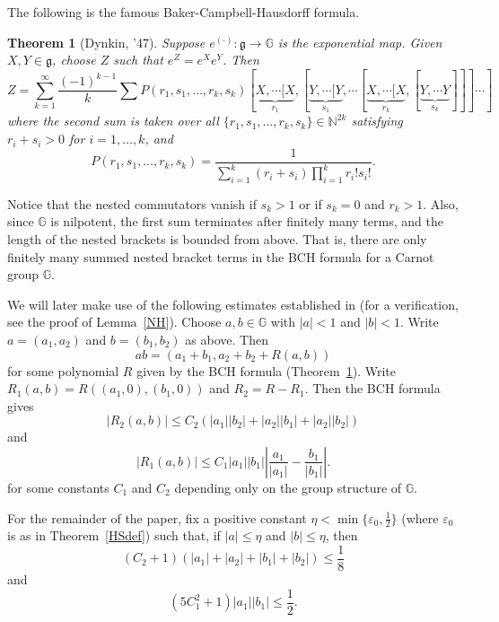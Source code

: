 \documentclass[11pt]{amsart}
\newtheorem{theorem}{Theorem}
\theoremstyle{definition}
\newcommand{\G}{\mathbb G}
\numberwithin{theorem}{section} \numberwithin{equation}{section}
\begin{document}
The following is the famous Baker-Campbell-Hausdorff formula.
\begin{theorem}[Dynkin, '47]
\label{BCH}
Suppose $e^{(\cdot)}:\mathfrak{g} \to \mathbb{G}$ is the exponential map.
Given $X,Y \in \mathfrak{g}$, 
choose $Z$ such that $e^Z = e^Xe^Y$.
Then
$$
Z = \sum_{k=1}^{\infty} \frac{(-1)^{k-1}}{k} \sum%
P(r_1,s_1,\dots,r_k,s_k)
[\underbrace{X, \cdots [X}_{r_1},[ \underbrace{Y,\cdots [Y}_{s_1}, \cdots
[\underbrace{X, \cdots [X}_{r_k},[ \underbrace{Y,\cdots Y}_{s_k}]]] \cdots]
$$
where the second sum is taken over all $\{r_1,s_1,\dots,r_k,s_k\} \in \mathbb{N}^{2k}$
satisfying $r_i + s_i > 0$ for $i=1,\dots,k$,
and
$$
P(r_1,s_1,\dots,r_k,s_k) = \frac{1}{\sum_{i=1}^k (r_i + s_i) \prod_{i=1}^k r_i! s_i!}.
$$
\end{theorem}
Notice that the nested commutators vanish if $s_k > 1$ or if $s_k = 0$ and $r_k>1$.
Also, since $\mathbb{G}$ is nilpotent, 
the first sum terminates after finitely many terms,
and the length of the nested brackets is bounded from above.
That is, there are only finitely many summed nested bracket terms in the BCH formula for a Carnot group $\mathbb{G}$.

We will later make use of the following estimates established in \cite{HebSik} (for a verification, see the proof of Lemma~\ref{NH}).
Choose $a,b \in \mathbb{G}$ with $|a|<1$ and $|b|<1$.
Write $a=(a_1,a_2)$ and $b=(b_1,b_2)$ as above.
Then
$$
ab = (a_1+b_1,a_2+b_2+R(a,b))
$$
for some polynomial $R$ given by the BCH formula (Theorem~\ref{BCH}).
Write $R_1(a,b) = R((a_1,0),(b_1,0))$ and $R_2 = R-R_1$.
Then the BCH formula gives
\begin{equation}
\label{HS2}
|R_2(a,b)| \leq C_2(|a_1||b_2| + |a_2||b_1| + |a_2||b_2|)
\end{equation}
and
\begin{equation}
\label{HS1}
|R_1(a,b)| \leq C_1|a_1||b_1| \left| \frac{a_1}{|a_1|} - \frac{b_1}{|b_1|} \right|.
\end{equation}
for some constants $C_1$ and $C_2$ depending only on the group structure of $\G$.


For the remainder of the paper, 
fix a positive constant $\eta < \min \{ \varepsilon_0, \tfrac12 \}$ 
(where $\varepsilon_0$ is as in Theorem~\ref{HSdef}) such that,
if $|a| \leq \eta$ and $|b| \leq \eta$, then
\begin{equation}
\label{HS3}
(C_2+1)(|a_1|+|a_2|+|b_1| +|b_2|)\leq \frac18
\end{equation}
and 
\begin{equation}
\label{HS4}
(5C_1^2+1) |a_1||b_1|  \leq \frac12.
\end{equation}
\end{document}
